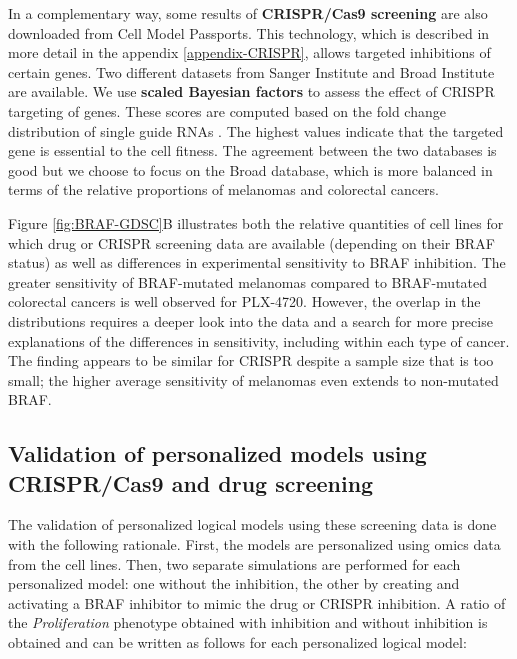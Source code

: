 \documentclass[a4paper,12pt,twoside,onecolumn,openright,final,oldfontcommands]{memoir}
\begin{document}
In a complementary way, some results of \textbf{CRISPR/Cas9 screening}
are also downloaded from Cell Model Passports. This technology, which is
described in more detail in the appendix \ref{appendix-CRISPR}, allows
targeted inhibitions of certain genes. Two different datasets from
Sanger Institute \citep{behan2019prioritization} and Broad Institute
\citep{meyers2017computational} are available. We use \textbf{scaled
Bayesian factors} to assess the effect of CRISPR targeting of genes.
These scores are computed based on the fold change distribution of
single guide RNAs \citep{hart2016bagel}. The highest values indicate
that the targeted gene is essential to the cell fitness. The agreement
between the two databases is good \citep{dempster2019agreement} but we
choose to focus on the Broad database, which is more balanced in terms
of the relative proportions of melanomas and colorectal cancers.

Figure \ref{fig:BRAF-GDSC}B illustrates both the relative quantities of
cell lines for which drug or CRISPR screening data are available
(depending on their BRAF status) as well as differences in experimental
sensitivity to BRAF inhibition. The greater sensitivity of BRAF-mutated
melanomas compared to BRAF-mutated colorectal cancers is well observed
for PLX-4720. However, the overlap in the distributions requires a
deeper look into the data and a search for more precise explanations of
the differences in sensitivity, including within each type of cancer.
The finding appears to be similar for CRISPR despite a sample size that
is too small; the higher average sensitivity of melanomas even extends
to non-mutated BRAF.

\subsection{Validation of personalized models using CRISPR/Cas9 and drug
screening}\label{validation-of-personalized-models-using-crisprcas9-and-drug-screening}

The validation of personalized logical models using these screening data
is done with the following rationale. First, the models are personalized
using omics data from the cell lines. Then, two separate simulations are
performed for each personalized model: one without the inhibition, the
other by creating and activating a BRAF inhibitor to mimic the drug or
CRISPR inhibition. A ratio of the \emph{Proliferation} phenotype
obtained with inhibition and without inhibition is obtained and can be
written as follows for each personalized logical model:
\end{document}
